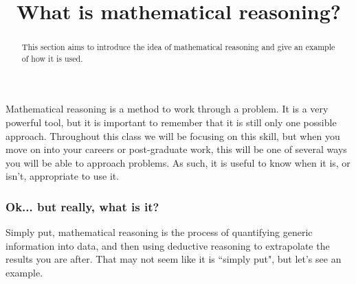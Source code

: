 \documentclass{ximeraXloud}
\title{What is mathematical reasoning?}
\begin{document}
\begin{abstract}
    This section aims to introduce the idea of mathematical reasoning and give an example of how it is used.
\end{abstract}
\maketitle

Mathematical reasoning is a method to work through a problem. It is a very powerful tool, but it is important to remember that it is still only one possible approach. Throughout this class we will be focusing on this skill, but when you move on into your careers or post-graduate work, this will be one of several ways you will be able to approach problems. As such, it is useful to know when it is, or isn't, appropriate to use it.


\subsubsection*{Ok... but really, what is it?}
    Simply put, mathematical reasoning is the process of quantifying generic information into data, and then using deductive reasoning to extrapolate the results you are after. That may not seem like it is ``simply put", but let's see an example.
    
\end{document}

